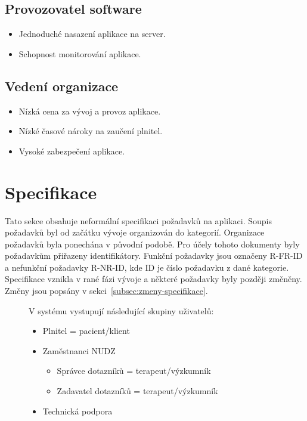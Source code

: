 \subsection*{Provozovatel software}\label{subsec:provozovatel-spravce-software}

\begin{itemize}
    \item
    Jednoduché nasazení aplikace na server.
    \item
    Schopnost monitorování aplikace.
\end{itemize}

\subsection*{Vedení organizace}\label{subsec:vedeni-organizace}

\begin{itemize}
    \item
    Nízká cena za vývoj a provoz aplikace.
    \item
    Nízké časové nároky na zaučení plnitel.
    \item
    Vysoké zabezpečení aplikace.
\end{itemize}


\section{Specifikace}\label{sec:specifikace}

Tato sekce obsahuje neformální specifikaci požadavků na aplikaci.
Soupis požadavků byl od začátku vývoje organizován do kategorií.
Organizace požadavků byla ponechána v původní podobě.
Pro účely tohoto dokumenty byly požadavkům přiřazeny identifikátory.
Funkční požadavky jsou označeny R-FR-ID a nefunkční požadavky R-NR-ID, kde ID je číslo požadavku z dané kategorie.
Specifikace vznikla v rané fázi vývoje a některé požadavky byly později změněny.
Změny jsou popsány v sekci~\ref{subsec:zmeny-specifikace}.

\begin{description}
    \item[]
    V systému vystupují následující skupiny uživatelů:

    \begin{itemize}
        \item
        Plnitel = pacient/klient

        \item
        Zaměstnanci NUDZ

        \begin{itemize}
            \item
            Správce dotazníků = terapeut/výzkumník
            \item
            Zadavatel dotazníků = terapeut/výzkumník
        \end{itemize}
        \item
        Technická podpora
    \end{itemize}

\end{description}


